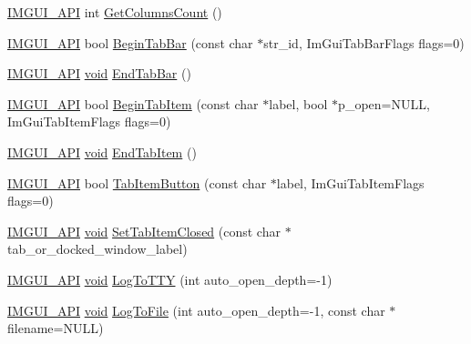 \begin{DoxyCompactItemize}
\item 
\hyperlink{imgui_8h_a43829975e84e45d1149597467a14bbf5}{I\+M\+G\+U\+I\+\_\+\+A\+PI} int \hyperlink{namespaceImGui_a3c2998ad9527948a4e4166c4f7db9ec9}{Get\+Columns\+Count} ()
\item 
\hyperlink{imgui_8h_a43829975e84e45d1149597467a14bbf5}{I\+M\+G\+U\+I\+\_\+\+A\+PI} bool \hyperlink{namespaceImGui_ab930db04eeff13f78ae76382c52db7eb}{Begin\+Tab\+Bar} (const char $\ast$str\+\_\+id, Im\+Gui\+Tab\+Bar\+Flags flags=0)
\item 
\hyperlink{imgui_8h_a43829975e84e45d1149597467a14bbf5}{I\+M\+G\+U\+I\+\_\+\+A\+PI} \hyperlink{imgui__impl__opengl3__loader_8h_ac668e7cffd9e2e9cfee428b9b2f34fa7}{void} \hyperlink{namespaceImGui_a864b8ece257d4e30569f0349752ad928}{End\+Tab\+Bar} ()
\item 
\hyperlink{imgui_8h_a43829975e84e45d1149597467a14bbf5}{I\+M\+G\+U\+I\+\_\+\+A\+PI} bool \hyperlink{namespaceImGui_a4cee1ccc9018a298cfff90a704bde8ca}{Begin\+Tab\+Item} (const char $\ast$label, bool $\ast$p\+\_\+open=N\+U\+LL, Im\+Gui\+Tab\+Item\+Flags flags=0)
\item 
\hyperlink{imgui_8h_a43829975e84e45d1149597467a14bbf5}{I\+M\+G\+U\+I\+\_\+\+A\+PI} \hyperlink{imgui__impl__opengl3__loader_8h_ac668e7cffd9e2e9cfee428b9b2f34fa7}{void} \hyperlink{namespaceImGui_a42abffd6af88c1362535514925e1358b}{End\+Tab\+Item} ()
\item 
\hyperlink{imgui_8h_a43829975e84e45d1149597467a14bbf5}{I\+M\+G\+U\+I\+\_\+\+A\+PI} bool \hyperlink{namespaceImGui_a1dbc539ac5b49e9445c4573607e6d60d}{Tab\+Item\+Button} (const char $\ast$label, Im\+Gui\+Tab\+Item\+Flags flags=0)
\item 
\hyperlink{imgui_8h_a43829975e84e45d1149597467a14bbf5}{I\+M\+G\+U\+I\+\_\+\+A\+PI} \hyperlink{imgui__impl__opengl3__loader_8h_ac668e7cffd9e2e9cfee428b9b2f34fa7}{void} \hyperlink{namespaceImGui_aad849238bf7c65665ac6a8a6ffecef98}{Set\+Tab\+Item\+Closed} (const char $\ast$tab\+\_\+or\+\_\+docked\+\_\+window\+\_\+label)
\item 
\hyperlink{imgui_8h_a43829975e84e45d1149597467a14bbf5}{I\+M\+G\+U\+I\+\_\+\+A\+PI} \hyperlink{imgui__impl__opengl3__loader_8h_ac668e7cffd9e2e9cfee428b9b2f34fa7}{void} \hyperlink{namespaceImGui_ad206c49bc6306a56d915251fa5d9e388}{Log\+To\+T\+TY} (int auto\+\_\+open\+\_\+depth=-\/1)
\item 
\hyperlink{imgui_8h_a43829975e84e45d1149597467a14bbf5}{I\+M\+G\+U\+I\+\_\+\+A\+PI} \hyperlink{imgui__impl__opengl3__loader_8h_ac668e7cffd9e2e9cfee428b9b2f34fa7}{void} \hyperlink{namespaceImGui_a8feab4b22519bc5eae9754b0ad545d81}{Log\+To\+File} (int auto\+\_\+open\+\_\+depth=-\/1, const char $\ast$filename=N\+U\+LL)

\end{DoxyCompactItemize}
